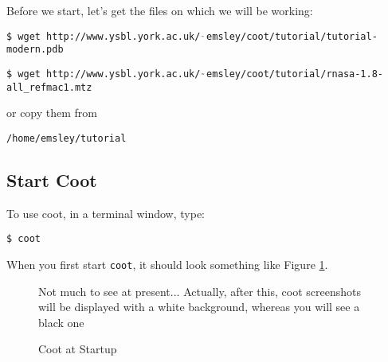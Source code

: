 \documentclass{article}
\newcommand {\atilde} {$_{\char '176}$} %
\begin{document}
Before we start, let's get the files on which we will be working:


\texttt{\small \$ wget http://www.ysbl.york.ac.uk/{\atilde}emsley/coot/tutorial/tutorial-modern.pdb}

\texttt{\small \$ wget http://www.ysbl.york.ac.uk/{\atilde}emsley/coot/tutorial/rnasa-1.8-all\_refmac1.mtz}

or copy them from 

\texttt{/home/emsley/tutorial}



\subsection{Start Coot}








To use coot, in a terminal window, type:

\texttt{\$ coot}

When you first start \texttt{coot}, it should look
something like Figure \ref{fig:start-coot}.

\begin{figure}[htbp]
  \begin{center}
    \leavevmode
    \epsfxsize 70mm
    \caption{Coot at Startup}{Not much to see at present...
      Actually, after this, coot screenshots will be displayed with a
      white background, whereas you will see a black one}
    \label{fig:start-coot}
  \end{center}
\end{figure}
\end{document}
